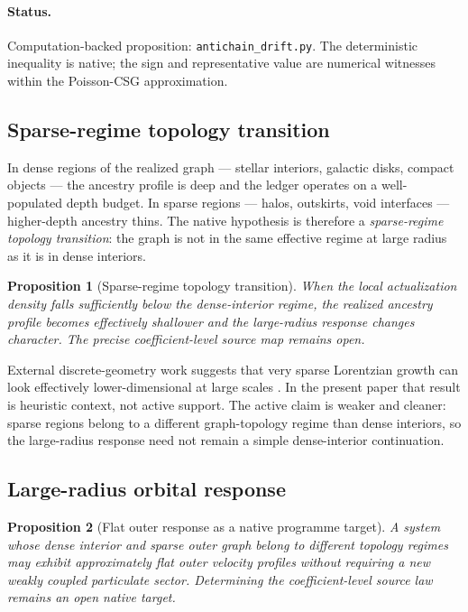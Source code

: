 \documentclass[11pt]{article}
\newtheorem{proposition}{Proposition}
\begin{document}
\paragraph{Status.} Computation-backed proposition: \texttt{antichain\_drift.py}. The deterministic inequality is native; the sign and representative value are numerical witnesses within the Poisson-CSG approximation.

\subsection{Sparse-regime topology transition}

In dense regions of the realized graph --- stellar interiors, galactic disks, compact objects --- the ancestry profile is deep and the ledger operates on a well-populated depth budget. In sparse regions --- halos, outskirts, void interfaces --- higher-depth ancestry thins. The native hypothesis is therefore a \emph{sparse-regime topology transition}: the graph is not in the same effective regime at large radius as it is in dense interiors.

\begin{proposition}[Sparse-regime topology transition]
When the local actualization density falls sufficiently below the dense-interior regime, the realized ancestry profile becomes effectively shallower and the large-radius response changes character. The precise coefficient-level source map remains open.
\end{proposition}

External discrete-geometry work suggests that very sparse Lorentzian growth can look effectively lower-dimensional at large scales \cite{Durhuus2010}. In the present paper that result is heuristic context, not active support. The active claim is weaker and cleaner: sparse regions belong to a different graph-topology regime than dense interiors, so the large-radius response need not remain a simple dense-interior continuation.

\subsection{Large-radius orbital response}

\begin{proposition}[Flat outer response as a native programme target]
A system whose dense interior and sparse outer graph belong to different topology regimes may exhibit approximately flat outer velocity profiles without requiring a new weakly coupled particulate sector. Determining the coefficient-level source law remains an open native target.
\end{proposition}
\end{document}
